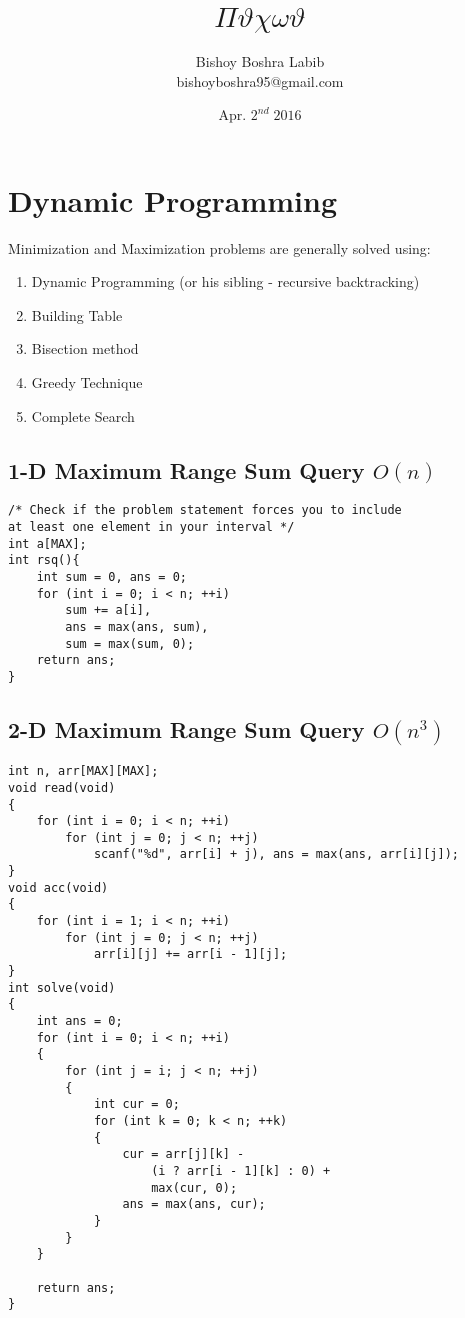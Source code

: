 \documentclass[12pt]{book}
\author{
Bishoy Boshra Labib \\bishoyboshra95@gmail.com
}
\date{Apr. $2^{nd}\;2016$}
\title{$\Pi\vartheta\chi\omega\vartheta$}
\begin{document}
\maketitle
\tableofcontents
\chapter{Dynamic Programming}
Minimization and Maximization problems are generally solved using:
\begin{enumerate}[label = \roman*.]
\item Dynamic Programming (or his sibling - recursive backtracking)
\item Building Table
\item Bisection method
\item Greedy Technique
\item Complete Search
\end{enumerate}
\section{1-D Maximum Range Sum Query $O(n)$}
\begin{verbatim}
/* Check if the problem statement forces you to include
at least one element in your interval */
int a[MAX];
int rsq(){
	int sum = 0, ans = 0;
	for (int i = 0; i < n; ++i)
		sum += a[i],
		ans = max(ans, sum),
		sum = max(sum, 0);
	return ans;
}
\end{verbatim}
\section{2-D Maximum Range Sum Query $O(n^3)$}
\begin{verbatim}
int n, arr[MAX][MAX];
void read(void)
{
	for (int i = 0; i < n; ++i)
		for (int j = 0; j < n; ++j)
			scanf("%d", arr[i] + j), ans = max(ans, arr[i][j]);
}
void acc(void)
{
	for (int i = 1; i < n; ++i)
		for (int j = 0; j < n; ++j)
			arr[i][j] += arr[i - 1][j];
}
int solve(void)
{
	int ans = 0;
	for (int i = 0; i < n; ++i)
	{
		for (int j = i; j < n; ++j)
		{
			int cur = 0;
			for (int k = 0; k < n; ++k)
			{
				cur = arr[j][k] -
					(i ? arr[i - 1][k] : 0) +
					max(cur, 0);
				ans = max(ans, cur);
			}
		}
	}
	
	return ans;
}
\end{verbatim}
\end{document}
